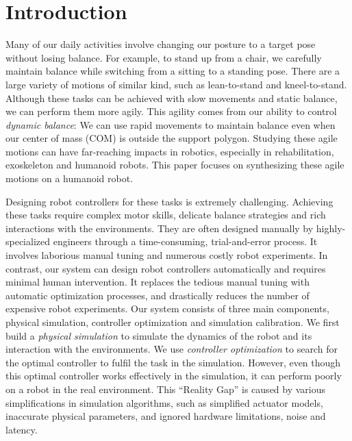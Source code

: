\section{Introduction}


Many of our daily activities involve changing our posture to a target pose without losing balance. For example, to stand up from a chair, we carefully maintain balance while switching from a sitting to a standing pose. There are a large variety of motions of similar kind, such as lean-to-stand and kneel-to-stand. Although these tasks can be achieved with slow movements and static balance, we can perform them more agily. This agility comes from our ability to control \emph{dynamic balance}: We can use rapid movements to maintain balance even when our center of mass (COM) is outside the support polygon. Studying these agile motions can have far-reaching impacts in robotics, especially in rehabilitation, exoskeleton and humanoid robots. This paper focuses on synthesizing these agile motions on a humanoid robot.



Designing robot controllers for these tasks is extremely challenging. Achieving these tasks require complex motor skills, delicate balance strategies and rich interactions with the environments. They are often designed manually by highly-specialized engineers through a time-consuming, trial-and-error process. It involves laborious manual tuning and numerous costly robot experiments. In contrast, our system can design robot controllers automatically and requires minimal human intervention. It replaces the tedious manual tuning with automatic optimization processes, and drastically reduces the number of expensive robot experiments. Our system consists of three main components, physical simulation, controller optimization and simulation calibration. We first build a \emph{physical simulation} to simulate the dynamics of the robot and its interaction with the environments. We use \emph{controller optimization} to search for the optimal controller to fulfil the task in the simulation. However, even though this optimal controller works effectively in the simulation, it can perform poorly on a robot in the real environment. This ``Reality Gap'' \cite{Jakobi95} is caused by various simplifications in simulation algorithms, such as simplified actuator models, inaccurate physical parameters, and ignored hardware limitations, noise and latency. 

